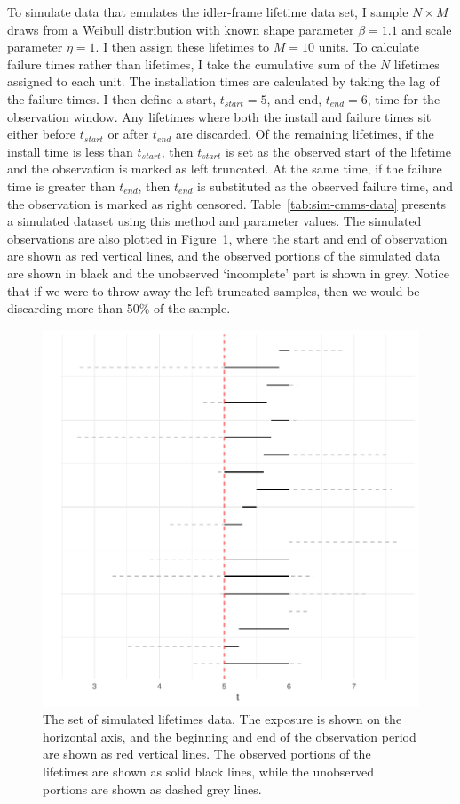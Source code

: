 To simulate data that emulates the idler-frame lifetime data set, I sample $N \times M$ draws from a Weibull distribution with known shape parameter $\beta = 1.1$ and scale parameter $\eta = 1$. I then assign these lifetimes to $M = 10$ units. To calculate failure times rather than lifetimes, I take the cumulative sum of the $N$ lifetimes assigned to each unit. The installation times are calculated by taking the lag of the failure times. I then define a start, $t_{start} = 5$, and end, $t_{end} = 6$, time for the observation window. Any lifetimes where both the install and failure times sit either before $t_{start}$ or after $t_{end}$ are discarded. Of the remaining lifetimes, if the install time is less than $t_{start}$, then $t_{start}$ is set as the observed start of the lifetime and the observation is marked as left truncated. At the same time, if the failure time is greater than $t_{end}$, then $t_{end}$ is substituted as the observed failure time, and the observation is marked as right censored. Table~\ref{tab:sim-cmms-data} presents a simulated dataset using this method and parameter values. The simulated observations are also plotted in Figure~\ref{fig:sim_censored_units}, where the start and end of observation are shown as red vertical lines, and the observed portions of the simulated data are shown in black and the unobserved `incomplete' part is shown in grey. Notice that if we were to throw away the left truncated samples, then we would be discarding more than 50\% of the sample.

\begin{figure}
    \centering
    \includegraphics[width=1\textwidth]{./figures/ch-2/sim-data.pdf}
    \caption{The set of simulated lifetimes data. The exposure is shown on the horizontal axis, and the beginning and end of the observation period are shown as red vertical lines. The observed portions of the lifetimes are shown as solid black lines, while the unobserved portions are shown as dashed grey lines.}
    \label{fig:sim_censored_units}
\end{figure}

